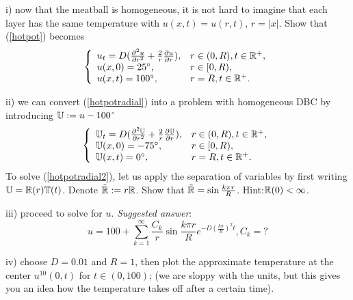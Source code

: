 \documentclass[6pt]{article}
\numberwithin{equation}{section}
\def\mathbb{\Bbb}
\begin{document}
\begin{enumerate}
i) now that the meatball is homogeneous, it is not hard to imagine that each layer has the same temperature with $u(x,t)=u(r,t)$, $r=|x|$.  Show that (\ref{hotpot}) becomes
\begin{equation}\label{hotpotradial}
\left\{
\begin{array}{ll}
u_t=D(\frac{\partial^2u}{\partial r^2}+\frac{2}{r}\frac{\partial u}{\partial r}),& r\in (0,R),t\in\mathbb R^+,\\
u(x,0)=25 \text{$^{\circ}$},&r\in [0,R),\\
u(x,t)=100 \text{$^{\circ}$}, &r=R, t\in\mathbb R^+.
\end{array}
\right.
\end{equation}

ii) we can convert (\ref{hotpotradial}) into a problem with homogeneous DBC by introducing $\mathbb U:=u-100$$^{\circ}$
\begin{equation}\label{hotpotradial2}
\left\{
\begin{array}{ll}
\mathbb U_t=D(\frac{\partial^2\mathbb U}{\partial r^2}+\frac{2}{r}\frac{\partial \mathbb U}{\partial r}),& r\in (0,R),t\in\mathbb R^+,\\
\mathbb U(x,0)=-75 \text{$^{\circ}$},&r\in [0,R),\\
\mathbb U(x,t)=0 \text{$^{\circ}$}, &r=R, t\in\mathbb R^+.
\end{array}
\right.
\end{equation}
To solve (\ref{hotpotradial2}), let us apply the separation of variables by first writing $\mathbb U=\mathbb R(r)\mathbb T(t)$.  Denote $\tilde {\mathbb R}:=r\mathbb R$.  Show that $\tilde {\mathbb R}=\sin\frac{k\pi r}{R}$.  Hint:$\mathbb R(0)<\infty$.

iii) proceed to solve for $u$.  \textit{Suggested answer}:
\[u=100+\sum_{k=1}^\infty \frac{C_k}{r}\sin\frac{k\pi r}{R}e^{-D(\frac{k\pi}{R})^2t}, C_k=?\]

iv) choose $D=0.01$ and $R=1$, then plot the approximate temperature at the center $u^{10}(0,t)$ for $t\in(0,100)$; (we are sloppy with the units, but this gives you an idea how the temperature takes off after a certain time).


\end{enumerate}
\end{document}
